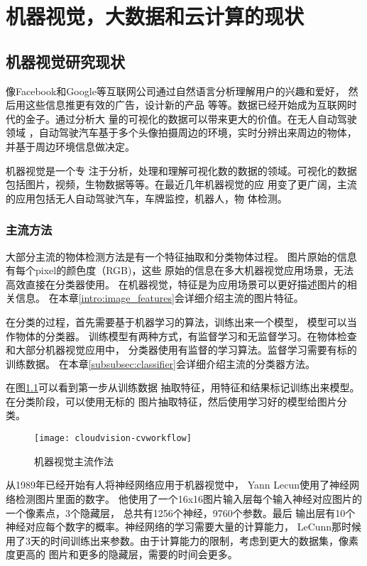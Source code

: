 \chapter{机器视觉，大数据和云计算的现状}
\label{sec:current_state}

\section{机器视觉研究现状}
\label{subsec:cv_background}
像Facebook和Google等互联网公司通过自然语言分析理解用户的兴趣和爱好，
然后用这些信息推更有效的广告，设计新的产品
等等。数据已经开始成为互联网时代的金子。通过分析大
量的可视化的数据可以带来更大的价值。在无人自动驾驶领域
，自动驾驶汽车基于多个头像拍摄周边的环境，实时分辨出来周边的物体，并基于周边环境信息做决定。

机器视觉是一个专
注于分析，处理和理解可视化数的数据的领域。可视化的数据
包括图片，视频，生物数据等等。在最近几年机器视觉的应
用变了更广阔，主流的应用包括无人自动驾驶汽车，车牌监控，机器人，物
体检测。


\subsection{主流方法}
大部分主流的物体检测方法是有一个特征抽取和分类物体过程。\cite{juan2009comparison}
图片原始的信息有每个pixel的颜色度（RGB)，这些
原始的信息在多大机器视觉应用场景，无法高效直接在分类器使用。
在机器视觉，特征是为应用场景可以更好描述图片的相关信息。
在本章\ref{intro:image_features}会详细介绍主流的图片特征。

在分类的过程，首先需要基于机器学习的算法，训练出来一个模型，
模型可以当作物体的分类器。
训练模型有两种方式，有监督学习和无监督学习。在物体检查和大部分机器视觉应用中，
分类器使用有监督的学习算法。监督学习需要有标的训练数据。
在本章\ref{subsubsec:classifier}会详细介绍主流的分类器方法。

在图\ref{fig:cloudvision-cvworkflow}可以看到第一步从训练数据
抽取特征，用特征和结果标记训练出来模型。在分类阶段，可以使用无标的
图片抽取特征，然后使用学习好的模型给图片分类。
\begin{figure}[H]
  \centering
    \texttt{[image: cloudvision-cvworkflow]}
  \caption{机器视觉主流作法}
  \label{fig:cloudvision-cvworkflow}
\end{figure}

从1989年已经开始有人将神经网络应用于机器视觉中，
Yann Lecun使用了神经网络检测图片里面的数字。\cite{lecun1989backpropagation}
他使用了一个16x16图片输入层每个输入神经对应图片的一个像素点，3个隐藏层，
总共有1256个神经，9760个参数。最后
输出层有10个神经对应每个数字的概率。神经网络的学习需要大量的计算能力，
LeCunn那时候用了3天的时间训练出来参数。由于计算能力的限制，考虑到更大的数据集，像素度更高的
图片和更多的隐藏层，需要的时间会更多。


